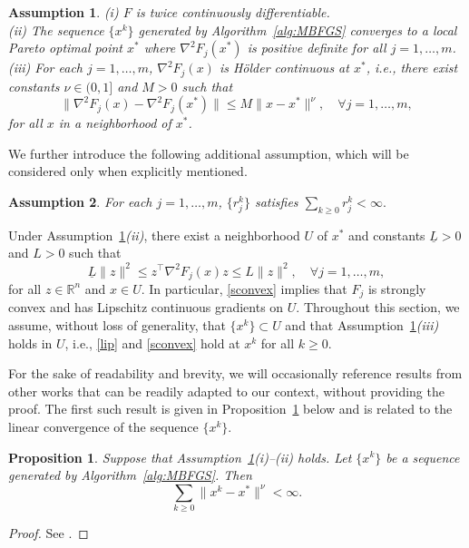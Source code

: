 \documentclass[11pt]{article}
\newtheorem{proposition}[theorem]{Proposition}
\newtheorem{assumption}{Assumption}[section]
\numberwithin{assumption}{section}
\newcommand{\xs}{x^{\ast}}
\newcommand{\HF}{\nabla^2 F}
\begin{document}
\begin{assumption}\label{assumption2}
\textit{(i)} $F$ is twice continuously differentiable.\\
\textit{(ii)}  The sequence $\{x^k\}$ generated by Algorithm~\ref{alg:MBFGS} converges to a local Pareto optimal point $x^{\ast}$ where $\HF_j(\xs)$ is positive definite for all $j=1,\ldots,m$.\\
\textit{(iii)} For each $j=1,\ldots,m$, $\HF_j(x)$ is Hölder continuous at $\xs$, i.e., there exist constants $\nu\in(0,1]$ and $M>0$ such that
 \begin{equation}\label{lip}
	\|\HF_j(x)-\HF_j(\xs)\|\leq M \|x-\xs\|^{\nu}, \quad \forall j=1,\ldots,m,
\end{equation} 
for all $x$ in a neighborhood of $\xs$.
\end{assumption}

We further introduce the following additional assumption, which will be considered only when explicitly mentioned.

\begin{assumption}\label{assumption3}
For each $j=1,\ldots,m$, $\{r_j^k\}$ satisfies $\sum_{k \geq 0} r_j^k < \infty.$
\end{assumption}

Under Assumption~\ref{assumption2}{\it (ii)}, there exist a neighborhood $U$ of $\xs$ and constants $\underline{L}>0$ and $L>0$ such that
 \begin{equation}\label{sconvex}
	 \underline{L}\|z\|^2 \leq z^\top \HF_j(x)z\leq L\|z\|^2, \quad \forall j=1,\ldots,m,
\end{equation} 
for all $z \in  \mathbb{R}^n$ and $x \in U$. 
In particular, \eqref{sconvex} implies that $F_j$ is strongly convex and has Lipschitz continuous gradients on $U$.
Throughout this section, we assume, without loss of generality, that $\{x^k\}\subset U$ and that Assumption~\ref{assumption2}{\it (iii)} holds in $U$, i.e., \eqref{lip}  and \eqref{sconvex} hold at $x^k$ for all $k\geq 0$.

For the sake of readability and brevity, we will occasionally reference results from other works that can be readily adapted to our context, without providing the proof.
The first such result is given in Proposition~\ref{prop:linear} below and is related to the linear convergence of the sequence $\{x^k\}$.

\begin{proposition}\label{prop:linear}
Suppose that Assumption~\ref{assumption2}{\it (i)--(ii)} holds. Let $\{x^k\}$ be a sequence generated by Algorithm~\ref{alg:MBFGS}. Then
\begin{equation}\label{argentina}
\sum_{k\geq 0}\|x^k-x^{\ast}\|^{\nu} < \infty.
\end{equation}
\end{proposition}
\begin{proof}
See \cite[Theorem~4.6]{Leandro&Danilo}.
\end{proof}
\end{document}
